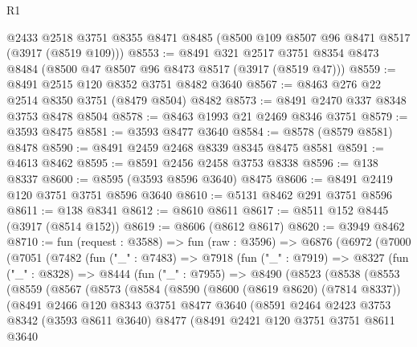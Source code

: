 \begin{lexlean}{R1}
\begin{coremodule}
    @2433
    @2518
    @3751
    @8355
    @8471
    @8485
    (@8500 @109 @8507 @96 @8471 @8517 (@3917 (@8519 @109)))
@8553 := @8491
    @321
    @2517
    @3751
    @8354
    @8473
    @8484
    (@8500 @47 @8507 @96 @8473 @8517 (@3917 (@8519 @47)))
@8559 := @8491 @2515 @120 @8352 @3751 @8482 @3640
@8567 := @8463 @276 @22 @2514 @8350 @3751 (@8479 @8504) @8482
@8573 := @8491 @2470 @337 @8348 @3753 @8478 @8504
@8578 := @8463 @1993 @21 @2469 @8346 @3751
@8579 := @3593 @8475
@8581 := @3593 @8477 @3640
@8584 := @8578 (@8579 @8581) @8478
@8590 := @8491 @2459 @2468 @8339 @8345 @8475 @8581
@8591 := @4613 @8462
@8595 := @8591 @2456 @2458 @3753 @8338
@8596 := @138 @8337
@8600 := @8595 (@3593 @8596 @3640) @8475
@8606 := @8491 @2419 @120 @3751 @3751 @8596 @3640
@8610 := @5131 @8462 @291 @3751 @8596
@8611 := @138 @8341
@8612 := @8610 @8611
@8617 := @8511 @152 @8445 (@3917 (@8514 @152))
@8619 := @8606 (@8612 @8617)
@8620 := @3949 @8462
@8710 := fun (request : @3588) =>
  fun (raw : @3596) =>
  @6876
    (@6972
      (@7000
        (@7051
          (@7482
            (fun ("_" : @7483) =>
            @7918
              (fun ("_" : @7919) =>
              @8327
                (fun ("_" : @8328) =>
                @8444
                  (fun ("_" : @7955) =>
                  @8490
                    (@8523
                      (@8538
                        (@8553
                          (@8559
                            (@8567
                              (@8573
                                (@8584
                                  (@8590
                                    (@8600 (@8619 @8620) (@7814 @8337))
                                    (@8491
                                      @2466
                                      @120
                                      @8343
                                      @3751
                                      @8477
                                      @3640
                                      (@8591
                                        @2464
                                        @2423
                                        @3753
                                        @8342
                                        (@3593 @8611 @3640)
                                        @8477
                                        (@8491
                                          @2421
                                          @120
                                          @3751
                                          @3751
                                          @8611
                                          @3640

\end{coremodule}
\end{lexlean}

